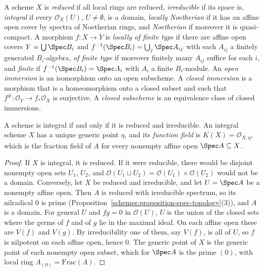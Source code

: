 \begin{definition}\label{schemes:definition-properties}
A scheme $X$ is \emph{reduced} if all local rings are reduced, \emph{irreducible} if its space is, \emph{integral} if every $\mathcal{O}_X(U)$, $U \neq \emptyset$,
is a domain, \emph{locally Noetherian} if it has an affine open cover by spectra of Noetherian rings, and \emph{Noetherian} if moreover it is
quasi-compact. A morphism $f \colon X \to Y$ is \emph{locally of finite type} if there are affine open covers $Y = \bigcup\Spec B_i$ and
$f^{-1}(\Spec B_i) = \bigcup_j\Spec A_{ij}$ with each $A_{ij}$ a finitely generated $B_i$-algebra, \emph{of finite type} if moreover finitely many $A_{ij}$
suffice for each $i$, and \emph{finite} if $f^{-1}(\Spec B_i) = \Spec A_i$ with $A_i$ a finite $B_i$-module. An \emph{open immersion} is an isomorphism onto
an open subscheme. A \emph{closed immersion} is a morphism that is a homeomorphism onto a closed subset and such that
$f^\# \colon \mathcal{O}_Y \to f_*\mathcal{O}_X$ is surjective. A \emph{closed subscheme} is an equivalence class of closed immersions.
\end{definition}

\begin{proposition}\label{schemes:proposition-integral}
A scheme is integral if and only if it is reduced and irreducible. An integral scheme $X$ has a unique generic point $\eta$, and its
\emph{function field} is $K(X) = \mathcal{O}_{X,\eta}$, which is the fraction field of $A$ for every nonempty affine open $\Spec A \subseteq X$.
\end{proposition}

\begin{proof}
If $X$ is integral, it is reduced. If it were reducible, there would be disjoint nonempty open sets $U_1$, $U_2$, and
$\mathcal{O}(U_1 \sqcup U_2) = \mathcal{O}(U_1) \times \mathcal{O}(U_2)$ would not be a domain. Conversely, let $X$ be reduced and irreducible, and let
$U = \Spec A$ be a nonempty affine open. Then $A$ is reduced with irreducible spectrum, so its nilradical $0$ is prime
(Proposition~\ref{schemes:proposition-spec-topology}(3)), and $A$ is a domain. For general $U$ and $fg = 0$ in $\mathcal{O}(U)$, $U$ is the union of the
closed sets where the germs of $f$ and of $g$ lie in the maximal ideal. On each affine open these are $V(f)$ and $V(g)$. By irreducibility one of
them, say $V(f)$, is all of $U$, so $f$ is nilpotent on each affine open, hence $0$. The generic point of $X$ is the generic point of each nonempty
open subset, which for $\Spec A$ is the prime $(0)$, with local ring $A_{(0)} = \mathrm{Frac}(A)$.
\end{proof}

